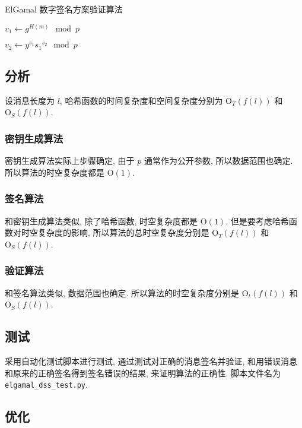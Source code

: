 \documentclass[12pt,a4paper]{article}
\begin{document}
\begin{algorithm}[H]
\caption{ElGamal 数字签名方案验证算法}

$ v_1 \leftarrow g^{H(m)} \mod p $

$ v_2 \leftarrow y^{s_1} {s_1}^{s_2} \mod p $

{
}
\end{algorithm}

\subsection*{分析}

设消息长度为 $ l $, 哈希函数的时间复杂度和空间复杂度分别为 $ \mathrm{O}_T(f(l)) $ 和 $ \mathrm{O}_S(f(l)) $. 

\subsubsection*{密钥生成算法}

密钥生成算法实际上步骤确定, 由于 $ p $ 通常作为公开参数, 所以数据范围也确定. 所以算法的时空复杂度都是 $ \mathrm{O}(1) $. 

\subsubsection*{签名算法}

和密钥生成算法类似, 除了哈希函数, 时空复杂度都是 $ \mathrm{O}(1) $. 但是要考虑哈希函数对时空复杂度的影响, 所以算法的总时空复杂度分别是 $ \mathrm{O}_T(f(l)) $ 和 $ \mathrm{O}_S(f(l)) $. 

\subsubsection*{验证算法}

和签名算法类似, 数据范围也确定. 所以算法的时空复杂度分别是 $ \mathrm{O}_t(f(l)) $ 和 $ \mathrm{O}_S(f(l)) $. 

\subsection*{测试}

采用自动化测试脚本进行测试, 通过测试对正确的消息签名并验证, 和用错误消息和原来的正确签名得到签名错误的结果, 来证明算法的正确性. 脚本文件名为 \verb|elgamal_dss_test.py|. 

\subsection*{优化}
\end{document}
